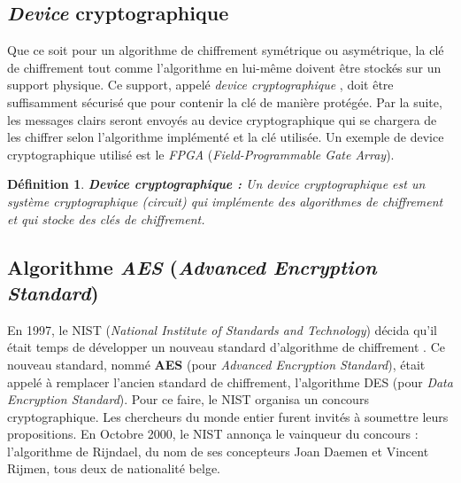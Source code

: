 \documentclass[oneside]{book}
\newtheorem{definition}{Définition}[section]
\begin{document}
\subsection{\textit{Device} cryptographique}
\label{sec:Introduction}

Que ce soit pour un algorithme de chiffrement symétrique ou asymétrique, la clé de chiffrement tout comme l'algorithme en lui-même doivent être stockés sur un support physique. Ce support, appelé \textit{device cryptographique} \cite{mangard_power_2007}, doit être suffisamment sécurisé que pour contenir la clé de manière protégée. Par la suite, les messages clairs seront envoyés au device cryptographique qui se chargera de les chiffrer selon l'algorithme implémenté et la clé utilisée. Un exemple de device cryptographique utilisé est le \textit{FPGA} (\textit{Field-Programmable Gate Array}).

\theoremstyle{definition}
\begin{definition}{\textbf{Device cryptographique :}}
Un device cryptographique est un système cryptographique (circuit) qui implémente des algorithmes de chiffrement et qui stocke des clés de chiffrement.
\end{definition}
\label{def:device}

\newpage

\subsection{Algorithme \textit{AES} (\textit{Advanced Encryption Standard})}
\label{subsec:AES}

En 1997, le NIST (\textit{National Institute of Standards and Technology}) décida qu'il était temps de développer un nouveau standard d'algorithme de chiffrement \cite{noauthor_fips_nodate}. Ce nouveau standard, nommé \textbf{AES} (pour \textit{Advanced Encryption Standard}), était appelé à remplacer l'ancien standard de chiffrement, l'algorithme DES (pour \textit{Data Encryption Standard}). Pour ce faire, le NIST organisa un concours cryptographique. Les chercheurs du monde entier furent invités à soumettre leurs propositions. En Octobre 2000, le NIST annonça le vainqueur du concours : l'algorithme de Rijndael, du nom de ses concepteurs Joan Daemen et Vincent Rijmen, tous deux de nationalité belge.
\end{document}
